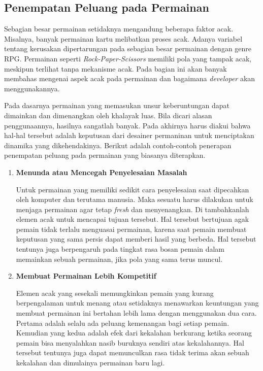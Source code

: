 \begin{subs}
	\subsection{Penempatan Peluang pada Permainan}
	\label{sec:sub_sec2_kesempatan}
	\vspace{1ex}
	
	Sebagian besar permainan setidaknya mengandung beberapa faktor acak. Misalnya, banyak permainan kartu melibatkan proses acak. Adanya variabel tentang kerusakan dipertarungan pada sebagian besar permainan dengan genre RPG. Permainan seperti \textit{Rock-Paper-Scissors} memiliki pola yang tampak acak, meskipun terlihat tanpa mekanisme acak. Pada bagian ini akan banyak membahas mengenai aspek acak pada permainan dan bagaimana \textit{developer} akan menggunakannya.
	\vspace{1ex}
	
	Pada dasarnya permainan yang memasukan unsur keberuntungan dapat dimainkan dan dimenangkan oleh khalayak luas. Bila dicari alasan penggunaannya, hasilnya sangatlah banyak. Pada akhirnya harus diakui bahwa hal-hal tersebut adalah keputusan dari desainer permaninan untuk menciptakan dinamika yang dikehendakinya. Berikut adalah contoh-contoh penerapan penempatan peluang pada permainan yang biasanya diterapkan.
	\vspace{1ex}
	
	\begin{enumerate}[label=\textbf{\alph*).}]
	
		\item \textbf{Menunda atau Mencegah Penyelesaian Masalah}
		\setlength{\parindent}{0.8cm}
	
		Untuk permainan yang memiliki sedikit cara penyelesaian saat dipecahkan oleh komputer dan terutama manusia. Maka sesuatu harus dilakukan untuk menjaga permainan agar tetap \textit{fresh} dan menyenangkan. Di tambahkanlah elemen acak untuk mencapai tujuan tersebut. Hal tersebut bertujuan agak pemain tidak terlalu menguasai permainan, karena saat pemain membuat keputusan yang sama persis dapat memberi hasil yang berbeda. Hal tersebut tentunya juga berpengaruh pada tingkat rasa bosan pemain dalam memainkan sebuah permainan, jika pola yang sama terus muncul.
		\vspace{1ex}
	
		\item \textbf{Membuat Permainan Lebih Kompetitif}
	
		Elemen acak yang sesekali memungkinkan pemain yang kurang berpengalaman untuk menang atau setidaknya menawarkan keuntungan yang membuat permainan ini bertahan lebih lama dengan menggunakan dua cara. Pertama adalah selalu ada peluang kemenangan bagi setiap pemain. Kemudian yang kedua adalah efek dari kekalahan berkurang ketika seorang pemain bisa menyalahkan nasib buruknya sendiri atas kekalahannya. Hal tersebut tentunya juga dapat memunculkan rasa tidak terima akan sebuah kekalahan dan dimulainya permainan baru lagi.
		\vspace{1ex}
		

\end{enumerate}
\end{subs}
